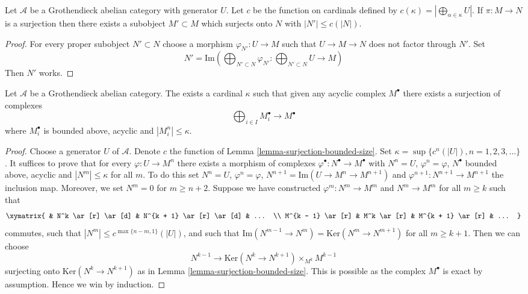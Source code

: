 \begin{lemma}
\label{lemma-surjection-bounded-size}
Let $\mathcal{A}$ be a Grothendieck abelian category with generator $U$.
Let $c$ be the function on cardinals defined by
$c(\kappa) = |\bigoplus_{\alpha \in \kappa} U|$. If $\pi : M \to N$ is a
surjection then there exists a subobject $M' \subset M$ which surjects
onto $N$ with $|N'| \leq c(|N|)$.
\end{lemma}

\begin{proof}
For every proper subobject $N' \subset N$ choose a morphism
$\varphi_{N'} : U \to M$ such that $U \to M \to N$ does not factor
through $N'$. Set
$$
N' = \text{Im}\left(
\bigoplus\nolimits_{N' \subset N} \varphi_{N'} :
\bigoplus\nolimits_{N' \subset N} U \longrightarrow M\right)
$$
Then $N'$ works.
\end{proof}

\begin{lemma}
\label{lemma-acyclic-quotient-complexes-bounded-size}
Let $\mathcal{A}$ be a Grothendieck abelian category.
The exists a cardinal $\kappa$ such that given any acyclic complex $M^\bullet$
there exists a surjection of complexes
$$
\bigoplus\nolimits_{i \in I} M_i^\bullet \longrightarrow M^\bullet
$$
where $M_i^\bullet$ is bounded above, acyclic and $|M_i^n| \leq \kappa$.
\end{lemma}

\begin{proof}
Choose a generator $U$ of $\mathcal{A}$. Denote $c$ the function of
Lemma \ref{lemma-surjection-bounded-size}.
Set $\kappa = \sup \{c^n(|U|), n = 1, 2, 3, \ldots\}$.
It suffices to prove that for every $\varphi : U \to M^n$
there exists a morphism of complexes
$\varphi^\bullet : N^\bullet \to M^\bullet$ with
$N^n = U$, $\varphi^n = \varphi$, $N^\bullet$ bounded above, acyclic
and $|N^m| \leq \kappa$ for all $m$. To do this set $N^n = U$,
$\varphi^n = \varphi$, $N^{n + 1} = \text{Im}(U \to M^n \to M^{n + 1})$
and $\varphi^{n + 1} : N^{n + 1} \to M^{n + 1}$ the inclusion map.
Moreover, we set $N^m = 0$ for $m \geq n + 2$.
Suppose we have constructed $\varphi^m : N^m \to M^m$ and
$N^m \to M^m$ for all $m \geq k$ such that
$$
\xymatrix{
& N^k \ar[r] \ar[d] & N^{k + 1} \ar[r] \ar[d] & ... \\
M^{k - 1} \ar[r] & M^k \ar[r] & M^{k + 1} \ar[r] & ...
}
$$
commutes, such that $|N^m| \leq c^{\max\{n - m, 1\}}(|U|)$, and such that
$\text{Im}(N^{m - 1} \to N^m) = \text{Ker}(N^m \to N^{m + 1})$ for
all $m \geq k + 1$. Then we can choose
$$
N^{k - 1} \longrightarrow \text{Ker}(N^k \to N^{k + 1}) \times_{M^k} M^{k - 1}
$$
surjecting onto $\text{Ker}(N^k \to N^{k + 1})$ as in
Lemma \ref{lemma-surjection-bounded-size}. This is possible as
the complex $M^\bullet$ is exact by assumption. Hence we win by induction.
\end{proof}

